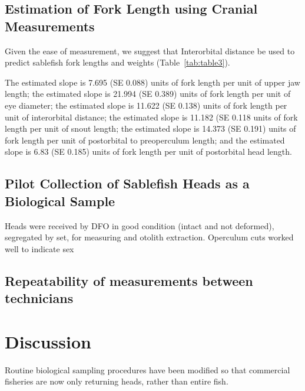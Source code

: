 \documentclass[12pt]{article}\usepackage[]{graphicx}\usepackage[]{color}
\begin{document}
\hypertarget{estimation-of-fork-length-using-cranial-measurements-1}{%
\subsection{Estimation of Fork Length using Cranial Measurements}\label{estimation-of-fork-length-using-cranial-measurements-1}}

Given the ease of measurement, we suggest that Interorbital distance be used to predict sablefish fork lengths and weights (Table~\ref{tab:table3}).

The estimated slope is 7.695 (SE 0.088) units of fork length per unit of upper jaw length; the estimated slope is 21.994 (SE 0.389) units of fork length per unit of eye diameter; the estimated slope is 11.622 (SE 0.138) units of fork length per unit of interorbital distance; the estimated slope is 11.182 (SE 0.118 units of fork length per unit of snout length; the estimated slope is 14.373 (SE 0.191) units of fork length per unit of postorbital to preoperculum length; and the estimated slope is 6.83 (SE 0.185) units of fork length per unit of postorbital head length.

\hypertarget{pilot-collection-of-sablefish-heads-as-a-biological-sample}{%
\subsection{Pilot Collection of Sablefish Heads as a Biological Sample}\label{pilot-collection-of-sablefish-heads-as-a-biological-sample}}

Heads were received by DFO in good condition (intact and not deformed), segregated by set, for measuring and otolith extraction. Operculum cuts worked well to indicate sex

\hypertarget{repeatability-of-measurements-between-technicians}{%
\subsection{Repeatability of measurements between technicians}\label{repeatability-of-measurements-between-technicians}}

\hypertarget{discussion}{%
\section{Discussion}\label{discussion}}

Routine biological sampling procedures have been modified so that commercial fisheries are now only returning heads, rather than entire fish.
\end{document}
